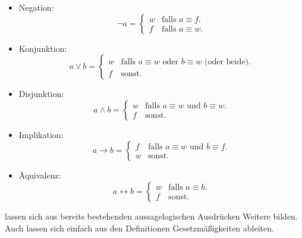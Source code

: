 \documentclass{scrreprt}
\begin{document}
    \begin{itemize}
        \item
            Negation:
            \begin{equation*}
                \neg a =
                    \begin{cases}
                        w & \text{falls $a \equiv f$}.\\
                        f & \text{falls $a \equiv w$}.
                    \end{cases}
            \end{equation*}
        \item
            Konjunktion:
            \begin{equation*}
                a \lor b =
                    \begin{cases}
                        w & \text{falls $a \equiv w$ oder $b \equiv w$ (oder beide)}.\\
                        f & \text{sonst}.
                    \end{cases}
            \end{equation*}
        \item
            Disjunktion:
            \begin{equation*}
                a \land b =
                    \begin{cases}
                        w & \text{falls $a \equiv w$ und $b \equiv w$}.\\
                        f & \text{sonst}.
                    \end{cases}
            \end{equation*}
        \item
            Implikation:
            \begin{equation*}
                a \rightarrow b =
                    \begin{cases}
                        f & \text{falls $a \equiv w$ und $b \equiv f$}.\\
                        w & \text{sonst}.
                    \end{cases}
            \end{equation*}
        \item
            Äquivalenz:
            \begin{equation*}
                a \leftrightarrow b =
                    \begin{cases}
                        w & \text{falls $a \equiv b$}.\\
                        f & \text{sonst}.
                    \end{cases}
            \end{equation*}
    \end{itemize}
    lassen sich aus bereits bestehenden aussagelogischen Ausdrücken Weitere bilden. Auch lassen sich einfach aus den Definitionen Gesetzmäßigkeiten ableiten.
\end{document}
